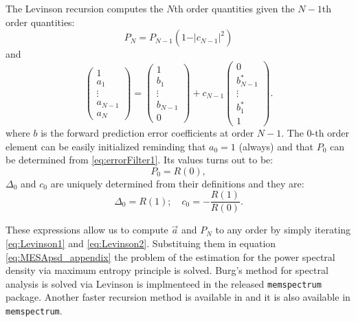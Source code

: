 \documentclass[twocolumn,showpacs,preprintnumbers,nofootinbib,prd,
superscriptaddress,10pt]{revtex4-1}
\begin{document}
The Levinson recursion computes the $N$th order quantities given the $N-1$th order quantities: 
\begin{equation} \label{eq:Levinson1}
P_N = P_{N -1}\left(1 - \vert c_{N - 1} \vert ^2\right)
\end{equation}
and 
\begin{equation} \label{eq:Levinson2}
\begin{pmatrix}
1 \\ a_1 \\ \vdots \\ a_{N - 1} \\ a_N
\end{pmatrix}
= 
\begin{pmatrix}
1 \\ b_1 \\ \vdots \\ b_{N -1} \\ 0
\end{pmatrix}
+ c_{N-1}
\begin{pmatrix}
0 \\ b_{N -1}^* \\ \vdots \\ b^*_1 \\ 1
\end{pmatrix}. 
\end{equation}
where $b$ is the forward prediction error coefficients at order $N-1$. 
The 0-th order element can be easily initialized reminding that $a_0 = 1$ (always) and that $P_0$ can be determined from \eqref{eq:errorFilter1}.
Its values turns out to be: 
\begin{equation}
P_0 = R(0),
\end{equation}
$\Delta_0$ and $c_0$ are uniquely determined from their definitions and they are:
\begin{equation}
\Delta_0 = R(1); \quad c_0 = -\frac{R(1)}{R(0)}. 
\end{equation}

These expressions allow us to compute $\vec a$ and $P_N$ to any order by simply iterating \eqref{eq:Levinson1} and \eqref{eq:Levinson2}. Substituing them in equation \eqref{eq:MESApsd_appendix} the problem of the estimation for the power spectral density via maximum entropy principle is solved.
Burg's method for spectral analysis is solved via Levinson is implmenteed in the released \texttt{memspectrum} package.
Another faster recursion method is available in \cite{Vos} and it is also available in \texttt{memspectrum}.


	
	
\end{document}
